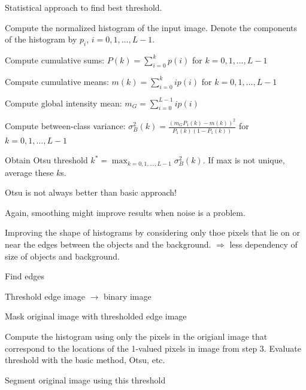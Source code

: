       Statistical approach to find best threshold.
      \begin{aufzaehlung}
      	\item Compute the normalized histogram of the input image. Denote the components of the 
      	  histogram by $p_i$, $i=0,1,\ldots,L-1$.
      	\item Compute cumulative sums: $P(k) = \sum_{i=0}^k p(i)$ for $k=0,1,\ldots,L-1$
      	\item Compute cumulative means: $m(k) = \sum_{i=0}^k i p(i)$ for $k=0,1,\ldots,L-1$
      	\item Compute global intensity mean: $m_G = \sum_{i=0}^{L-1} i p(i)$
      	\item Compute between-class variance: $\sigma_B^2(k) = \frac{(m_G P_1(k) - m(k))^2}{P_1(k)(1-P_1(k))}$ 
      	  for $k=0,1,\ldots,L-1$
      	\item Obtain Otsu threshold $k^* = \max_{k = 0,1,\ldots,L-1} \sigma_B^2(k)$. If max is not unique,
      	  average these $k$s.
      \end{aufzaehlung}
      Otsu is not always better than basic approach!
      
      Again, smoothing might improve results when noise is a problem.
      
      Improving the shape of histograms by considering only thoe pixels that lie on or near the edges
      between the objects and the background. $\Rightarrow$ less dependency of size of objects and background.
      \begin{aufzaehlung}
      	\item Find edges
      	\item Threshold edge image $\rightarrow$ binary image
      	\item Mask original image with thresholded edge image
      	\item Compute the histogram using only the pixels in the origianl image that correspond to 
      	  the locations of the 1-valued pixels in image from step 3. Evaluate threshold with the 
      	  basic method, Otsu, etc.
        \item Segment original image using this threshold
      \end{aufzaehlung}
      
